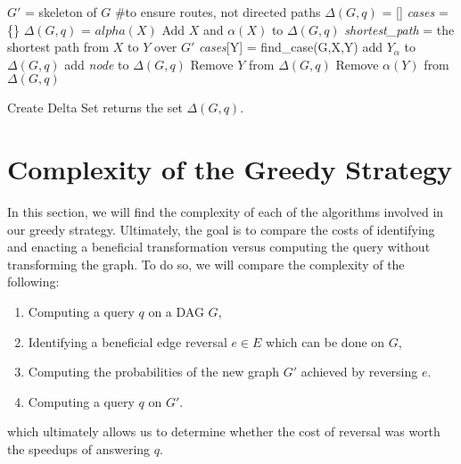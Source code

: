 \begin{algorithm}[h!]
\DontPrintSemicolon
{}
\begin{spacing}{1.25}

$G'$ = skeleton of $G$ \#to ensure routes, not directed paths \;
$\Delta(G,q)$ = [] \;
\textit{cases} = \{\} \;
 {
	$\Delta(G,q)$ = $alpha(X)$ \;
}
Add $X$ and $\alpha(X)$ to $\Delta(G,q)$ \;
 {
	\textit{shortest\_path} = the shortest path from $X$ to $Y$ over $G'$ \;
	\textit{cases}[Y] = find\_case(G,X,Y) \;
	 {
		 {
			add $Y_{\alpha}$ to $\Delta(G,q)$ \;
		}
	 {
		 {
			add \textit{node} to $\Delta(G,q)$ \;
			}
		Remove $Y$ from $\Delta(G,q)$ \;
		Remove $\alpha(Y)$ from $\Delta(G,q)$ \;
		}
	}
}



\end{spacing}
\caption{{\sc Create Delta Set} returns the set $\Delta(G,q)$.}
\label{algo:createdeltaset}
\end{algorithm}










\section{Complexity of the Greedy Strategy}

\null \quad \quad In this section, we will find the complexity of each of the algorithms involved in our greedy strategy. Ultimately, the goal is to compare the costs of identifying and enacting a beneficial transformation versus computing the query without transforming the graph. To do so, we will compare the complexity of the following: 
\begin{enumerate}
\item Computing a query $q$ on a DAG $G$,
\item Identifying a beneficial edge reversal $e \in E$ which can be done on $G$,
\item Computing the probabilities of the new graph $G'$ achieved by reversing $e$.
\item Computing a query $q$ on $G'$. 
\end{enumerate}
which ultimately allows us to determine whether the cost of reversal was worth the speedups of answering $q$. \newline


